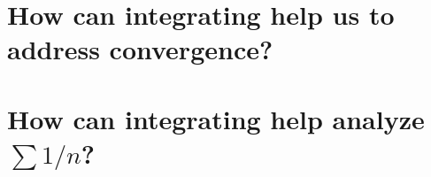 \documentclass{ximera}
\begin{document}
\section{How can integrating help us to address convergence?}


\section{How can integrating help analyze $\sum 1/n$?}

\end{document}
